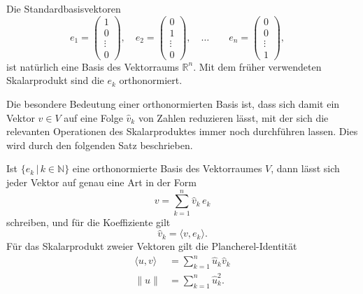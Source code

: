 Die Standardbasisvektoren
\[
e_1 = \begin{pmatrix}1\\0\\\vdots\\0\end{pmatrix},\quad
e_2 = \begin{pmatrix}0\\1\\\vdots\\0\end{pmatrix},\quad
\dots
\qquad
e_n = \begin{pmatrix}0\\0\\\vdots\\1\end{pmatrix},\quad
\]
ist natürlich eine Basis des Vektorraums $\mathbb R^n$.
Mit dem früher verwendeten Skalarprodukt sind die $e_k$ orthonormiert.

Die besondere Bedeutung einer orthonormierten Basis ist, dass sich damit
ein Vektor $v\in V$ auf eine Folge $\hat{v}_k$ von Zahlen reduzieren 
lässt, mit der sich die relevanten Operationen des Skalarproduktes
immer noch durchführen lassen.
Dies wird durch den folgenden Satz beschrieben.

\begin{satz}
\label{satz:parseval}
Ist $\{e_k\,|\, k\in\mathbb N\}$ eine orthonormierte Basis des Vektorraumes
$V$, dann lässt sich jeder Vektor auf genau eine Art in der Form 
\begin{equation}
v = \sum_{k=1}^n \hat v_k\, e_k
\label{gemoetrie:zerlegung}
\end{equation}
schreiben, und für die Koeffiziente gilt
\begin{equation}
\hat{v}_k = \langle v,e_k\rangle.
\label{geometrie:synthese}
\end{equation}
Für das Skalarprodukt zweier Vektoren gilt die Plancherel-Identität
\begin{align}
\langle u,v\rangle
&=
\sum_{k=1}^n \hat{u}_k\hat{v}_k
\label{geometrie:parseval-prod}
\\
\|u\|
&=
\sum_{k=1}^n \hat{u}_k^2.
\label{geometrie:parseval-norm}
\end{align}
\end{satz}

